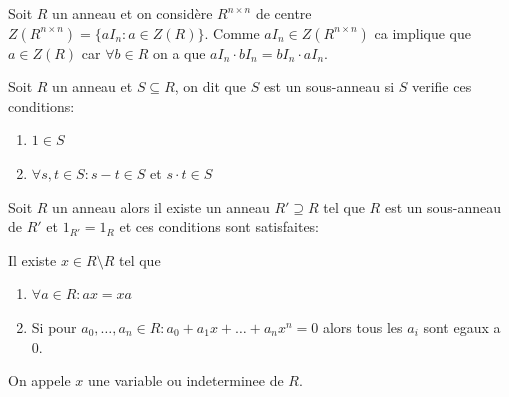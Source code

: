 \begin{example}
	Soit $R$ un anneau et on considère $R^{n\times n}$ de centre $Z(R^{n\times n})=\{ aI_{n}:a\in Z(R) \}$. Comme $aI_{n}\in Z(R^{n\times n})$ ca implique que $a\in Z(R)$ car $\forall b\in R$ on a que $aI_{n}\cdot bI_{n}=bI_{n}\cdot aI_{n}$.
\end{example}
\begin{theorem}
Soit $R$ un anneau et $S\subseteq R$, on dit que $S$ est un sous-anneau si $S$ verifie ces conditions:
\begin{enumerate}
\item \label{ssanneau1} $1\in S$
\item \label{ssanneau2} $\forall s,t\in S:s-t\in S$ et $s\cdot t\in S$
\end{enumerate}
\end{theorem}
\begin{theorem}\label{thm22}
Soit $R$ un anneau alors il existe un anneau $R'\supseteq R$ tel que $R$ est un sous-anneau de $R'$ et $1_{R'}=1_{R}$ et ces conditions sont satisfaites:

Il existe $x \in R\setminus R$ tel que
\begin{enumerate} 
\item  $\forall a\in R:ax=xa$
\item Si pour $a_{0},\dots,a_{n}\in R:a_{0}+a_{1}x+\dots+a_{n}x^{n}=0$ alors tous les $a_{i}$ sont egaux a 0.
\end{enumerate}
On appele $x$ une variable ou indeterminee de $R$. 
\end{theorem}
